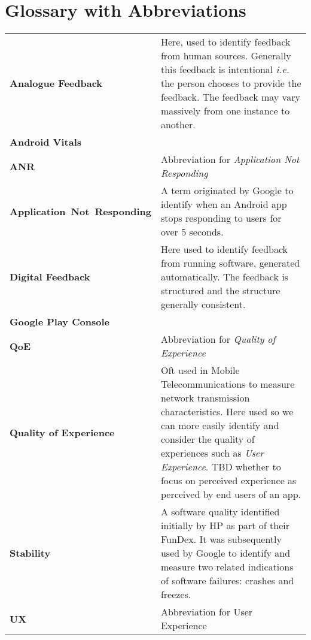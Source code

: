 \section{Glossary with Abbreviations}
\begin{tabular}{@{}>{\bfseries}p{5.3cm}p{9.2cm}@{}}
Analogue Feedback & Here, used to identify feedback from human sources. Generally this feedback is intentional \emph{i.e.} the person chooses to provide the feedback. The feedback may vary massively from one instance to another.\\
Android Vitals & \\
ANR & Abbreviation for \emph{Application Not Responding} \\
Application~\mbox{Not Responding} & A term originated by Google to identify when an Android app stops responding to users for over 5 seconds. \\
Digital Feedback & Here used to identify feedback from running software, generated automatically. The feedback is structured and the structure generally consistent.\\
Google Play Console & \\
QoE & Abbreviation for \emph{Quality of Experience} \\
Quality of Experience & Oft used in Mobile Telecommunications to measure network transmission characteristics. Here used so we can more easily identify and consider the quality of experiences such as \emph{User Experience}. TBD whether to focus on perceived experience as perceived by end users of an app.\\
Stability &A software quality identified initially by HP as part of their FunDex. It was subsequently used by Google to identify and measure two related indications of software failures: crashes and freezes. \\ %
UX & Abbreviation for User Experience \\

\end{tabular}
